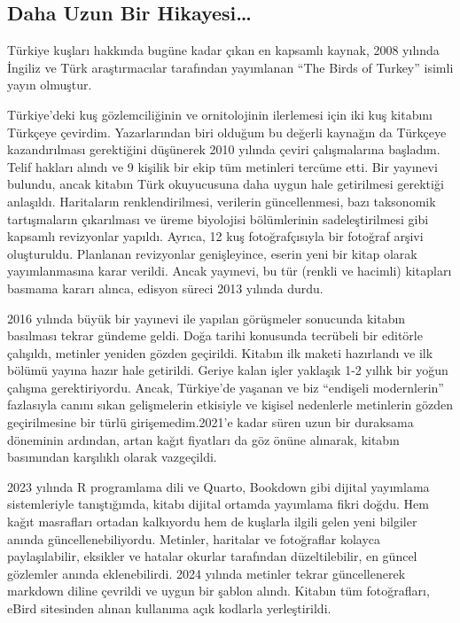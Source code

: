 \documentclass[
  letterpaper,
  DIV=11,
  numbers=noendperiod]{scrreprt}
\begin{document}
\subsection*{Daha Uzun Bir
Hikayesi\ldots{}}\label{daha-uzun-bir-hikayesi}

Türkiye kuşları hakkında bugüne kadar çıkan en kapsamlı kaynak, 2008
yılında İngiliz ve Türk araştırmacılar tarafından yayımlanan ``The Birds
of Turkey'' isimli yayın olmuştur.

Türkiye'deki kuş gözlemciliğinin ve ornitolojinin ilerlemesi için iki
kuş kitabını Türkçeye çevirdim. Yazarlarından biri olduğum bu değerli
kaynağın da Türkçeye kazandırılması gerektiğini düşünerek 2010 yılında
çeviri çalışmalarına başladım. Telif hakları alındı ve 9 kişilik bir
ekip tüm metinleri tercüme etti. Bir yayınevi bulundu, ancak kitabın
Türk okuyucusuna daha uygun hale getirilmesi gerektiği anlaşıldı.
Haritaların renklendirilmesi, verilerin güncellenmesi, bazı taksonomik
tartışmaların çıkarılması ve üreme biyolojisi bölümlerinin
sadeleştirilmesi gibi kapsamlı revizyonlar yapıldı. Ayrıca, 12 kuş
fotoğrafçısıyla bir fotoğraf arşivi oluşturuldu. Planlanan revizyonlar
genişleyince, eserin yeni bir kitap olarak yayımlanmasına karar verildi.
Ancak yayınevi, bu tür (renkli ve hacimli) kitapları basmama kararı
alınca, edisyon süreci 2013 yılında durdu.

2016 yılında büyük bir yayınevi ile yapılan görüşmeler sonucunda kitabın
basılması tekrar gündeme geldi. Doğa tarihi konusunda tecrübeli bir
editörle çalışıldı, metinler yeniden gözden geçirildi. Kitabın ilk
maketi hazırlandı ve ilk bölümü yayına hazır hale getirildi. Geriye
kalan işler yaklaşık 1-2 yıllık bir yoğun çalışma gerektiriyordu. Ancak,
Türkiye'de yaşanan ve biz ``endişeli modernlerin'' fazlasıyla canını
sıkan gelişmelerin etkisiyle ve kişisel nedenlerle metinlerin gözden
geçirilmesine bir türlü girişemedim.2021'e kadar süren uzun bir
duraksama döneminin ardından, artan kağıt fiyatları da göz önüne
alınarak, kitabın basımından karşılıklı olarak vazgeçildi.

2023 yılında R programlama dili ve Quarto, Bookdown gibi dijital
yayımlama sistemleriyle tanıştığımda, kitabı dijital ortamda yayımlama
fikri doğdu. Hem kağıt masrafları ortadan kalkıyordu hem de kuşlarla
ilgili gelen yeni bilgiler anında güncellenebiliyordu. Metinler,
haritalar ve fotoğraflar kolayca paylaşılabilir, eksikler ve hatalar
okurlar tarafından düzeltilebilir, en güncel gözlemler anında
eklenebilirdi. 2024 yılında metinler tekrar güncellenerek markdown
diline çevrildi ve uygun bir şablon alındı. Kitabın tüm fotoğrafları,
eBird sitesinden alınan kullanıma açık kodlarla yerleştirildi.
\end{document}
